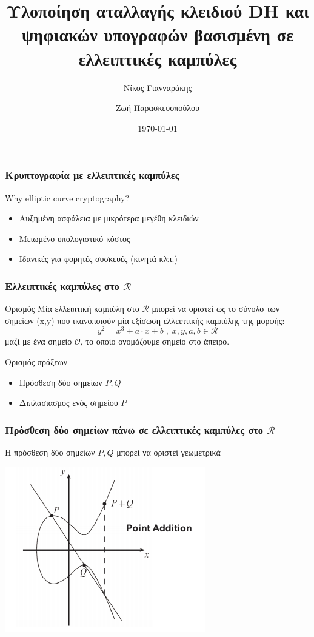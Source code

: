 \documentclass{beamer}
\title[Elliptic Curve Cryptography]{Υλοποίηση αταλλαγής κλειδιού DH και ψηφιακών υπογραφών βασισμένη σε ελλειπτικές καμπύλες}
\author{Νίκος Γιανναράκης\\ \and Ζωή Παρασκευοπούλου}
\institute[]
{
Σχολή Ηλεκτρολόγων Μήχανικών και Μηχανικών Υπολογιστών\\
Εθνικό Μετσόβιο Πολυτεχνείο
}
\date{\today}
\begin{document}
\begin{frame}
\titlepage
\end{frame}
\begin{frame}
\frametitle{Κρυπτογραφία με ελλειπτικές καμπύλες}
\begin{block}
{Why elliptic curve cryptography?}
\begin{itemize}
\item Αυξημένη ασφάλεια με μικρότερα μεγέθη κλειδιών
\item Μειωμένο υπολογιστικό κόστος
\item Ιδανικές για φορητές συσκευές (κινητά κλπ.)
\end{itemize}
\end{block}
\end{frame}
%
\begin{frame}
\frametitle{Ελλειπτικές καμπύλες στο $\mathcal{R}$}
\begin{block}
{Ορισμός}
Μία ελλειπτική καμπύλη στο $\mathcal{R}$ μπορεί να οριστεί ως το σύνολο των σημείων (x,y) που ικανοποιούν μία εξίσωση ελλειπτικής καμπύλης της μορφής: 
$$y^2 = x^3 + a \cdot x + b \; , \; x,y,a,b \in \mathcal{R}$$
μαζί με ένα σημείο $\mathcal{O}$, το οποίο ονομάζουμε σημείο στο άπειρο.
\end{block}
\begin{block}
{Ορισμός πράξεων}
\begin{itemize}
\item Πρόσθεση δύο σημείων $P,Q$
\item Διπλασιασμός ενός σημείου $P$
\end{itemize}
\end{block}
\end{frame}

%
\begin{frame}
\frametitle{Πρόσθεση δύο σημείων πάνω σε ελλειπτικές καμπύλες στο $\mathcal{R}$}
H πρόσθεση δύο σημείων $P, Q$ μπορεί να οριστεί γεωμετρικά
\begin{center}
\includegraphics[scale=0.5]{add.png}

\end{center}\end{frame}
\end{document}
